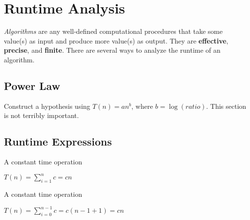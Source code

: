 
\chapter{Runtime Analysis}

\textit{Algorithms} are any well-defined computational procedures that take some value(s) as input and produce more value(s) as output. They are \textbf{effective}, \textbf{precise}, and \textbf{finite}. There are several ways to analyze the runtime of an algorithm.

\section{Power Law}

\noindent Construct a hypothesis using $T(n) = an^{b}$, where $b = \log (ratio)$.
This section is not terribly important.

\section{Runtime Expressions}

\begin{multicols}{2}
  \noindent \hrulefill
  \begin{algorithmic}
     
    \State A constant time operation
    \EndFor
  \end{algorithmic}
  \noindent \hrulefill

  $T(n) = \sum_{i=1}^{n} c = cn$

  \columnbreak

  \noindent \hrulefill
  \begin{algorithmic}
     
    \State A constant time operation
    \EndFor
  \end{algorithmic}
  \noindent \hrulefill

  $T(n) = \sum_{i=0}^{n-1} c = c(n - 1 + 1) = cn$
\end{multicols}

